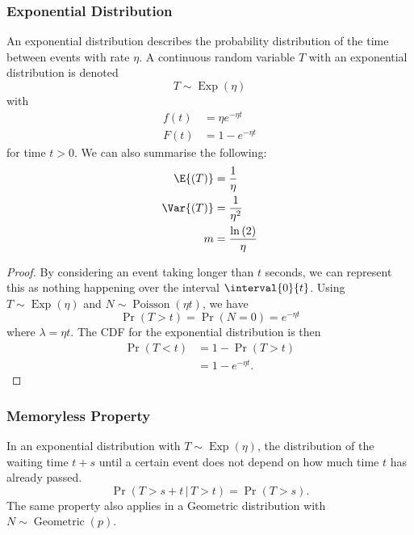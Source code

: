 \documentclass{article}
\begin{document}
\subsubsection{Exponential Distribution}
An exponential distribution describes the probability distribution of
the time between events with rate \(\eta\). A continuous random
variable \(T\) with an exponential distribution is denoted
\begin{equation*}
    T \sim \operatorname{Exp}{\left( \eta \right)}
\end{equation*}
with
\begin{align*}
    f\left( t \right) & = \eta e^{-\eta t} \\
    F\left( t \right) & = 1 - e^{-\eta t}
\end{align*}
for time \(t > 0\).
We can also summarise the following:
\begin{align*}
    \E{\left( T \right)}   & = \frac{1}{\eta}                     \\
    \Var{\left( T \right)} & = \frac{1}{\eta^2}                   \\
    m                      & = \frac{\ln{\left( 2 \right)}}{\eta}
\end{align*}
\begin{proof}
    By considering an event taking longer than \(t\) seconds, we can
    represent this as nothing happening over the interval
    \(\interval{0}{t}\). Using
    \(T \sim \operatorname{Exp}{\left( \eta \right)}\) and
    \(N \sim \operatorname{Poisson}{\left( \eta t \right)}\), we have
    \begin{equation*}
        \Pr{\left( T > t \right)} = \Pr{\left( N = 0 \right)} = e^{-\eta t}
    \end{equation*}
    where \(\lambda = \eta t\). The CDF for the exponential distribution
    is then
    \begin{align*}
        \Pr{\left( T < t \right)} & = 1 - \Pr{\left( T > t \right)} \\
                                  & = 1 - e^{-\eta t}.
    \end{align*}
\end{proof}
\subsubsection{Memoryless Property}
In an exponential distribution with \(T \sim \operatorname{Exp}{\left(
\eta \right)}\), the distribution of the waiting time \(t + s\) until a
certain event does not depend on how much time \(t\) has already
passed.
\begin{equation*}
    \Pr{\left( T > s + t \,\vert\, T > t \right)} = \Pr{\left( T > s \right)}.
\end{equation*}
The same property also applies in a Geometric distribution with \(N \sim \operatorname{Geometric}{\left( p \right)}\).
\end{document}
